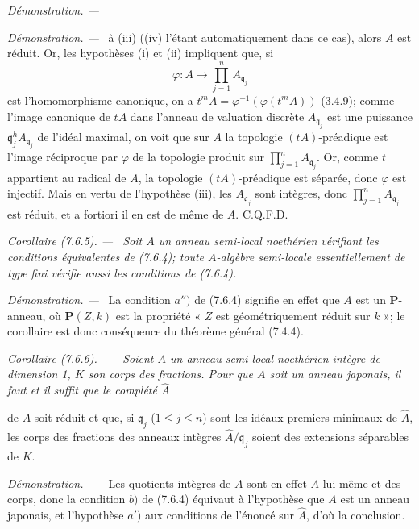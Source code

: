 \documentclass[10pt,oneside]{book}
\newcommand{\oldpage}[2][]{%
  \setcounter{footnote}{0}%
  \marginpar{\scriptsize\textbf{#1}~|~#2}\ignorespaces}
\newenvironment{corollary}[1][]{%
  \par\medskip\noindent\itshape Corollaire (#1). ---\ }{\par}
\newenvironment{proof}{%
  \par\medskip\noindent\textit{Démonstration. ---\ }}{\par}
\begin{document}
\begin{proof}
\begin{proof}
à (iii) ((iv) l'étant automatiquement dans ce cas), alors $A$ est réduit. Or,
les hypothèses (i) et (ii) impliquent que, si
\[
\varphi:A\longrightarrow\prod_{j=1}^nA_{\mathfrak q_j}
\]
est l'homomorphisme canonique, on a
$t^mA=\varphi^{-1}(\varphi(t^mA))$ (3.4.9); comme l'image canonique de $tA$
dans l'anneau de valuation discrète $A_{\mathfrak q_j}$ est une puissance
$\mathfrak q_j^hA_{\mathfrak q_j}$ de l'idéal maximal, on voit que sur $A$ la
topologie $(tA)$-préadique est l'image réciproque par $\varphi$ de la topologie
produit sur $\prod_{j=1}^nA_{\mathfrak q_j}$. Or, comme $t$ appartient au
radical de $A$, la topologie $(tA)$-préadique est séparée, donc $\varphi$ est
injectif. Mais en vertu de l'hypothèse (iii), les $A_{\mathfrak q_j}$ sont
intègres, donc $\prod_{j=1}^nA_{\mathfrak q_j}$ est réduit, et a fortiori il en
est de même de $A$. C.Q.F.D.
\end{proof}
\end{proof}

\begin{corollary}[7.6.5]
\label{IV.2.s7.6.5-fr}
Soit $A$ un anneau semi-local noethérien vérifiant les conditions équivalentes
de (7.6.4); toute $A$-algèbre semi-locale essentiellement de type fini vérifie
aussi les conditions de (7.6.4).
\end{corollary}

\begin{proof}
La condition $a'')$ de (7.6.4) signifie en effet que $A$ est un
$\boldsymbol P$-anneau, où $\boldsymbol P(Z,k)$ est la propriété « $Z$ est
géométriquement réduit sur $k$ »; le corollaire est donc conséquence du
théorème général (7.4.4).
\end{proof}

\begin{corollary}[7.6.6]
\label{IV.2.s7.6.6-fr}
Soient $A$ un anneau semi-local noethérien intègre de dimension 1, $K$ son
corps des fractions. Pour que $A$ soit un anneau japonais, il faut et il suffit
que le complété $\widehat A$

\oldpage[IV-2]{212}

de $A$ soit réduit et que, si $\mathfrak q_j$ ($1\leq j\leq n$) sont les
idéaux premiers minimaux de $\widehat A$, les corps des fractions des anneaux
intègres $\widehat A/\mathfrak q_j$ soient des extensions séparables de $K$.
\end{corollary}

\begin{proof}
Les quotients intègres de $A$ sont en effet $A$ lui-même et des corps, donc la
condition $b)$ de (7.6.4) équivaut à l'hypothèse que $A$ est un anneau
japonais, et l'hypothèse $a')$ aux conditions de l'énoncé sur $\widehat A$,
d'où la conclusion.
\end{proof}
\end{document}

